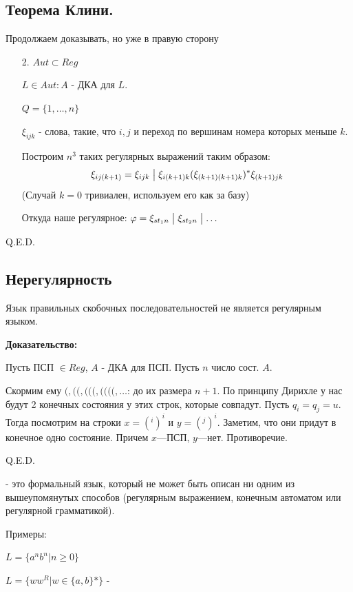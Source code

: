 \subsection{Теорема Клини.}

Продолжаем доказывать, но уже в правую сторону

\begin{enumerate}
    \item[2.] $Aut \subset Reg$

    $L \in Aut: A$ - ДКА для $L$.

    $Q = \{1,\ldots, n\}$

    $\xi_{ijk}$ - слова, такие, что $i,j$ и переход по вершинам номера которых меньше $k$.

    Построим $n^3$ таких регулярных выражений таким образом:
    $$\xi_{ij (k+1)} = \xi_{ijk} \bigm| \xi_{i(k+1)k}(\xi_{(k+1) (k+1) k})^* \xi_{(k+1)jk}$$
    (Случай $k=0$ тривиален, используем его как за базу)
    
    Откуда наше регулярное: $\varphi = \xi_{s t_1n} \bigm| \xi_{st_2n} \bigm| \ldots$
    
\end{enumerate}

\hfill Q.E.D.

\subsection{Нерегулярность}

Язык правильных скобочных последовательностей не является регулярным языком.

\textbf{Доказательство:}

Пусть ПСП $\in Reg$, $A$ - ДКА для ПСП. Пусть $n$ число сост. $A$.

Скормим ему $(,((,(((,((((,\ldots$: до их размера $n+1$. По принципу Дирихле у нас будут 2 конечных состояния у этих строк, которые совпадут. Пусть $q_i = q_j  = u$. Тогда посмотрим на строки $x= (^i)^i$ и $y = (^j)^i$. Заметим, что они придут в конечное одно состояние. Причем $x$---ПСП, $y$---нет. Противоречие.

\hfill Q.E.D.

 - это формальный язык, который не может быть описан ни одним из вышеупомянутых способов (регулярным выражением, конечным автоматом или регулярной грамматикой).

Примеры:

$L = \{a^n b^n | n \geq 0\}$

$L = \{w w^R | w \in \{a, b\}* \}$ - 

